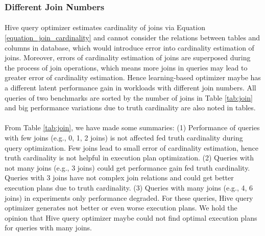     \subsubsection{Different Join Numbers}
        \paragraph{}
        Hive query optimizer estimates cardinality of joins via Equation \ref{equation_join_cardinality} and cannot consider the relations between tables 
        and columns in database, which would introduce error into cardinality estimation of joins. Moreover, errors of cardinality estimation of joins are superposed 
        during the process of join operations, which means more joins in queries may lead to greater error of cardinality estimation. Hence learning-based optimizer maybe has 
        a different latent performance gain in workloads with different join numbers. All queries of two benchmarks are sorted by the number of joins in Table 
        \ref{tab:join} and big performance variations due to truth cardinality are also noted in tables.
        \paragraph{}
        From Table \ref{tab:join}, we have made some summaries:
        \newline
        (1) Performance of queries with few joins (e.g., 0, 1, 2 joins) is not affected fed truth cardinality during query optimization. Few joins lead to small error
        of cardinality estimation, hence truth cardinality is not helpful in execution plan optimization.
        \newline
        (2) Queries with not many joins (e.g., 3 joins) could get performance gain fed truth cardinality. Queries with 3 joins have not complex join relations and 
        could get better execution plans due to truth cardinality.
        \newline
        (3) Queries with many joins (e.g., 4, 6 joins) in experiments only performance degraded. For these queries, Hive query optimizer generates not better or even worse 
        execution plans. We hold the opinion that Hive query optimizer maybe could not find optimal execution plans for queries with many joins.      

